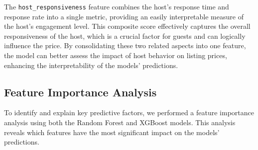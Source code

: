 \documentclass[12pt]{article}
\begin{document}
The \texttt{host\_responsiveness} feature combines the host's response time and response rate into a single metric, providing an easily interpretable measure of the host's engagement level. This composite score effectively captures the overall responsiveness of the host, which is a crucial factor for guests and can logically influence the price. By consolidating these two related aspects into one feature, the model can better assess the impact of host behavior on listing prices, enhancing the interpretability of the models' predictions.

\subsection{Feature Importance Analysis}

To identify and explain key predictive factors, we performed a feature importance analysis using both the Random Forest and XGBoost models. This analysis reveals which features have the most significant impact on the models' predictions.
\end{document}
